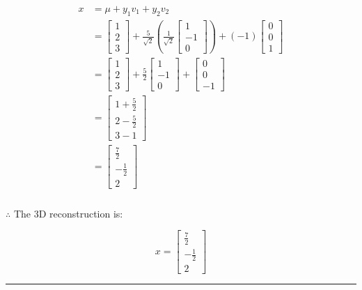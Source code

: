 \documentclass{article}
\begin{document}
{\begin{align*}
x &= \mu + y_1 v_1 + y_2 v_2\\
&= \begin{bmatrix}1 \\ 2 \\ 3\end{bmatrix}
+ \frac{5}{\sqrt{2}}\left(\frac{1}{\sqrt{2}}\begin{bmatrix}1 \\ -1 \\ 0\end{bmatrix}\right)
+ (-1)\begin{bmatrix}0 \\ 0 \\ 1\end{bmatrix} \\
&= \begin{bmatrix}1 \\ 2 \\ 3\end{bmatrix}
+ \frac{5}{2}\begin{bmatrix}1 \\ -1 \\ 0\end{bmatrix}
+ \begin{bmatrix}0 \\ 0 \\ -1\end{bmatrix}\\
&= \begin{bmatrix}1+\frac{5}{2} \\ 2-\frac{5}{2} \\ 3-1\end{bmatrix}\\
&= \begin{bmatrix}\frac{7}{2} \\-\frac{1}{2} \\ 2\end{bmatrix}
\end{align*}
\subsubsection*{\normalfont}{$\therefore$ The 3D reconstruction is:}

$$x=\begin{bmatrix}\tfrac{7}{2} \\[6pt] -\tfrac{1}{2} \\[6pt] 2\end{bmatrix}$$

\noindent\rule{\textwidth}{0.4pt}\\

}
\end{document}
